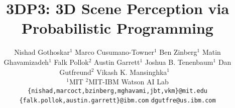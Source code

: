 \documentclass{article}
\title{3DP3: 3D Scene Perception via\\Probabilistic Programming}
\author{%
Nishad Gothoskar$^1$
\And Marco Cusumano-Towner$^1$
\And Ben Zinberg$^1$
\AND Matin Ghavamizadeh$^1$
\And Falk Pollok$^2$
\And Austin Garrett$^1$
\AND Joshua B. Tenenbaum$^1$
\And Dan Gutfreund$^2$
\And Vikash K. Mansinghka$^1$
\AND
\vspace{-0.8cm}~\\
{$^1$MIT} \hspace{1cm} {$^2$MIT-IBM Watson AI Lab}\\
\texttt{\{nishad,marcoct,bzinberg,mghavami,jbt,vkm\}@mit.edu}\\
\texttt{\{falk.pollok,austin.garrett\}@ibm.com} \quad \quad \texttt{dgutfre@us.ibm.com}
}
\begin{document}
\maketitle
\vspace{-0.5cm}
\begin{abstract}

\end{abstract}

\maketitle

\vspace{-0.5cm}














\appendix
\newpage









\end{document}
